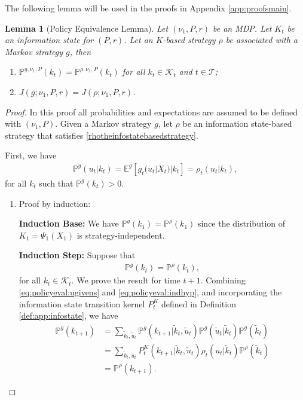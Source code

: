 \documentclass[pdflatex,sn-basic]{sn-jnl}
\newcommand{\E}{\mathbb{E}}
\renewcommand{\Pr}{\mathbb{P}}
\newcommand{\Comp}{K}
\newcommand{\comp}{k}
\newcommand{\Compset}{\mathcal{K}}
\theoremstyle{thmstyleone}%
\newtheorem{lemma}{Lemma}
\theoremstyle{thmstyletwo}%
\theoremstyle{thmstylethree}%
\begin{document}
\begin{appendices}
The following lemma will be used in the proofs in Appendix \ref{app:proofsmain}.

\begin{lemma}[Policy Equivalence Lemma]\label{lem:policyeval}
	Let $(\nu_1, P, r)$ be an MDP. Let $\Comp_t$ be an information state for $(P, r)$. Let an $\Comp$-based strategy $\rho$ be associated with a Markov strategy $g$, then
 	\begin{enumerate}[(1)]
 		\item $\Pr^{g, \nu_1, P}(\comp_t)=\Pr^{\rho, \nu_1, P}(\comp_t)$ for all $\comp_t\in\Compset_t$ and $t\in\mathcal{T}$;
 		\item $J(g; \nu_1, P, r) = J(\rho; \nu_1, P, r)$.
 	\end{enumerate}
\end{lemma}

\begin{proof}
	In this proof all probabilities and expectations are assumed to be defined with $(\nu_1, P)$.
	Given a Markov strategy $g$, let $\rho$ be an information state-based strategy that satisfies \eqref{rhotheinfostatebasedstrategy}. 
	
	First, we have
	\begin{align}
		\Pr^g(u_t|\comp_t) = \E^g[g_t(u_t|X_t)|\comp_t] = \rho_t(u_t|\comp_t) \label{eq:policyeval:ugivens},
	\end{align}
	for all $\comp_t$ such that $\Pr^g(\comp_t) > 0$.
	
	\begin{enumerate}[(1)]
		\item Proof by induction:
		
		\textbf{Induction Base:} We have $\Pr^g(\comp_1) = \Pr^\rho(\comp_1)$ since the distribution of $\Comp_1=\Psi_1(X_1)$ is strategy-independent.
		
		\textbf{Induction Step:} Suppose that 
		\begin{align}
			\Pr^g(\comp_t) = \Pr^\rho(\comp_t),\label{eq:policyeval:indhyp}
		\end{align}
		for all $\comp_t\in\Compset_t$. We prove the result for time $t+1$. Combining \eqref{eq:policyeval:ugivens} and \eqref{eq:policyeval:indhyp}, and incorporating the information state transition kernel $P_t^K$ defined in Definition \ref{def:app:infostate}, we have
		\begin{align}
			\Pr^g(\comp_{t+1}) &= \sum_{\tilde{\comp}_t, \tilde{u}_t} \Pr^g(\comp_{t+1}|\tilde{\comp}_t, \tilde{u}_t)\Pr^g(\tilde{u}_t|\tilde{\comp}_t)\Pr^g(\tilde{\comp}_t) \\
			&=\sum_{\tilde{\comp}_t, \tilde{u}_t} P_t^{\Comp}(\comp_{t+1}|\tilde{\comp}_t, \tilde{u}_t)\rho_t(u_t|\tilde{\comp}_t)\Pr^\rho(\tilde{\comp}_t)\\
			&=\Pr^\rho(\comp_{t+1}).
		\end{align}
  

\end{enumerate}
\end{proof}
\end{appendices}
\end{document}
